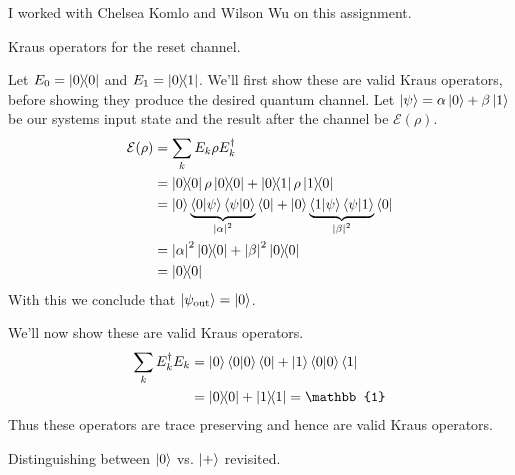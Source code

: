 \documentclass[boxes,pages]{homework}
\begin{document}
\noindent
I worked with Chelsea Komlo and Wilson Wu on this assignment.

\begin{problem}
Kraus operators for the reset channel.
\end{problem}

\begin{solution}
	Let $E_0 = \ketbra{0}{0}$ and $E_1 = \ketbra{0}{1}$. We'll first show these are valid Kraus operators, before showing they produce the desired quantum channel.
	Let $\ket{\psi} = \alpha\ket{0} + \beta\ket{1}$ be our systems input state and the result after the channel be $\mathcal{E}(\rho)$.
	\begin{align*}
		\mathcal{E}(\rho) & = \sum_k E_k\rho E_k^\dagger                                                                                                                                 \\
		                  & = \ketbra{0}{0}\rho\ketbra{0}{0} + \ketbra{0}{1}\rho\ketbra{1}{0}                                                                                            \\
		                  & = \ket{0}\underbrace{\braket{0}{\psi}\braket{\psi}{0}}_{\abs{\alpha}^2}\bra{0} + \ket{0}\underbrace{\braket{1}{\psi}\braket{\psi}{1}}_{\abs{\beta}^2}\bra{0} \\
		                  & = \abs{\alpha}^2\ketbra{0}{0} + \abs{\beta}^2\ketbra{0}{0}                                                                                                   \\
		                  & = \ketbra{0}{0}
	\end{align*}
	With this we conclude that $\ket{\psi_\text{out}} = \ket{0}$.

	We'll now show these are valid Kraus operators.
	\begin{align*}
		\sum_k E_k^\dagger E_k & = \ket{0}\braket{0}{0}\bra{0} + \ket{1}\braket{0}{0}\bra{1} \\
		                       & = \ketbra{0}{0} + \ketbra{1}{1} = \mathbb{1}
	\end{align*}
	Thus these operators are trace preserving and hence are valid Kraus operators.
\end{solution}

\begin{problem}
Distinguishing between $\ket{0}$ vs. $\ket{+}$ revisited.
\end{problem}
\end{document}
